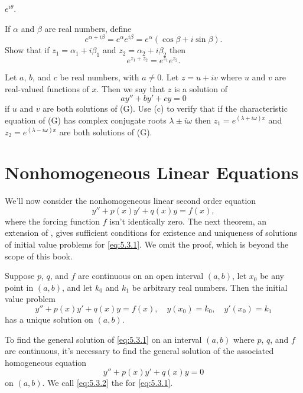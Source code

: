 \begin{exerciselist}
\begin{alist}
$e^{i\theta}$.
\item %
If  $\alpha$ and $\beta$ are real numbers,
define
\[
e^{\alpha+i\beta}=e^\alpha e^{i\beta}=e^\alpha(\cos\beta+i\sin\beta).
\tag{F}
\]
Show that if $z_1=\alpha_1+i\beta_1$ and $z_2=\alpha_2+i\beta_2$ then
\[
e^{z_1+z_2}=e^{z_1}e^{z_2}.
\]
\item %
Let $a$, $b$, and $c$ be real numbers, with $a\ne0$. Let $z=u+iv$
where $u$ and $v$ are real-valued functions of $x$. Then we say that
$z$ is a solution of
\[
ay''+by'+cy=0
\tag{G}
\]
if $u$ and $v$ are both solutions of (G).
Use (c) to verify that if the
characteristic equation of (G) has complex conjugate roots
$\lambda\pm i\omega$ then
$z_1=e^{(\lambda+i\omega)x}$ and $z_2=e^{(\lambda-i\omega)x}$
are both solutions of (G).
\end{alist}
\end{exerciselist}


\section{Nonhomogeneous Linear Equations}\label{sec:nonhomog_linear}

We'll now consider the nonhomogeneous linear second order equation
\begin{equation} \label{eq:5.3.1}
y''+p(x)y'+q(x)y=f(x),
\end{equation}
where the forcing function $f$ isn't  identically zero.
The next
theorem, an extension of , gives sufficient
conditions for existence and uniqueness of solutions of initial value
problems for \eqref{eq:5.3.1}. We omit the proof, which is beyond the
scope of this book.

\begin{theorem}\label{thmtype:5.3.1}
Suppose $p$, $q$, and $f$ are continuous on an open interval
$(a,b)$, let $x_0$ be any point in $(a,b)$, and let $k_0$ and $k_1$ be
arbitrary real numbers. Then the initial value problem
\[
y''+p(x)y'+q(x)y=f(x), \quad  y(x_0)=k_0,\quad y'(x_0)=k_1
\]
has a unique solution  on $(a,b)$.
\end{theorem}

To find the general solution of  \eqref{eq:5.3.1}
on an interval $(a,b)$ where $p$, $q$, and $f$ are continuous,
it's necessary to find the general solution  of
 the associated homogeneous equation
\begin{equation} \label{eq:5.3.2}
y''+p(x)y'+q(x)y=0
\end{equation}
on $(a,b)$. We call \eqref{eq:5.3.2} the
for \eqref{eq:5.3.1}.


